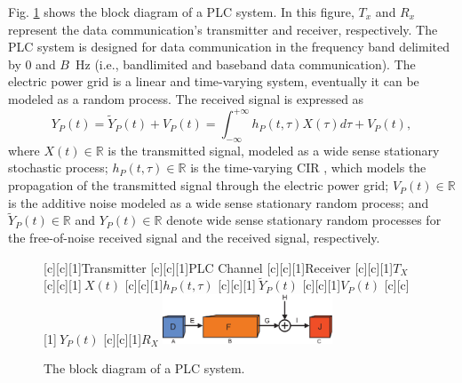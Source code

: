 \documentclass[journal]{IEEEtran}
\begin{document}
Fig. \ref{PLCchannel} shows the block diagram of a \ac{PLC} system. In this figure, $T_x$ and $R_x$ represent the data communication's transmitter and receiver, respectively. The \ac{PLC} system is designed for data communication in the frequency band delimited by $0$ and $B$~Hz (i.e., bandlimited and baseband data communication). The electric power grid is a linear and time-varying system, eventually it can be modeled as a random process. The received signal is expressed as
\begin{equation} \label{received signal}
Y_P(t) = \tilde{Y}_P(t)+V_P(t) = \int_{-\infty}^{+\infty} h_P(t,\tau) X(\tau) d\tau + V_P(t),
\end{equation}
where $X(t)\in \mathbb{R}$ is the transmitted signal, modeled as a wide sense stationary stochastic process; $h_P(t,\tau)\in \mathbb{R}$ is the time-varying \ac{CIR}%
, which models the propagation of the transmitted signal through the electric power grid; $V_P(t)\in \mathbb{R}$ is the additive noise modeled as a wide sense stationary random process; and $\tilde{Y}_P(t)\in \mathbb{R}$ and $Y_P(t)\in \mathbb{R}$ denote wide sense stationary random processes for the free-of-noise received signal and the received signal, respectively.

\begin{figure}[h]
	\centering
	[c][1]{Transmitter}
	[c][1]{PLC Channel}
	[c][1]{Receiver}
	[c][1]{$T_X$}
	[c][1]{$~X(t)$}
	[c][1]{$h_P(t,\tau)$}
	[c][1]{$~\tilde{Y}_P(t)$}
	[c][1]{$V_P(t)$}
	[c][1]{$~Y_P(t)$}
	[c][1]{$R_X$}
	\includegraphics[width=0.45\textwidth]{images/PLCchannel.eps}
	\caption{The block diagram of a PLC system.}
	\label{PLCchannel}
\end{figure}
\end{document}
